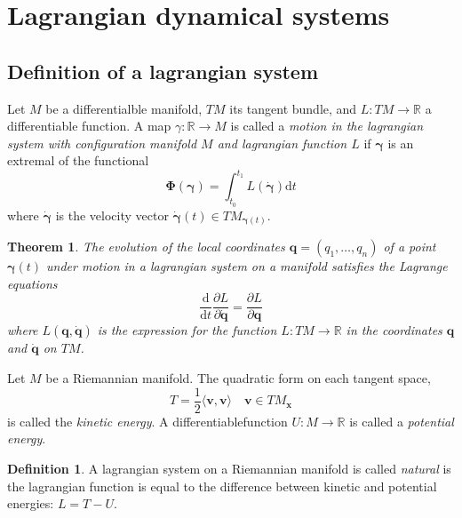 \documentclass[conference]{IEEEtran}
\newtheorem{theorem}{Theorem}[section]
\theoremstyle{definition}
\newtheorem{definition}{Definition}[section]
\theoremstyle{remark}
\begin{document}
    \section{Lagrangian dynamical systems}
    \subsection{Definition of a lagrangian system}
    Let $M$ be a differentialble manifold, $TM$ its tangent bundle, and $L: TM \to \mathbb{R}$ a differentiable function. A map $\gamma: \mathbb{R} \to M$ is called a \emph{motion in the lagrangian system with configuration manifold $M$ and lagrangian function $L$} if $\bm{\gamma}$ is an extremal of the functional
    \begin{equation*}
        \bm{\Phi}(\bm{\gamma}) = \int_{t_0}^{t_1} L(\dot{\bm{\gamma}}) \mathrm{d} t
    \end{equation*}
    where $\dot{\bm{\gamma}}$ is the velocity vector $\dot{\bm{\gamma}}(t) \in TM_{\bm{\gamma}(t)}$.

    \begin{theorem}
        The evolution of the local coordinates $\mathbf{q} = (q_1, \dots, q_n)$ of a point $\bm{\gamma}(t)$ under motion in a lagrangian system on a manifold satisfies the Lagrange equations
        \begin{equation*}
            \dfrac{\mathrm{d}}{\mathrm{d} t} \dfrac{\partial L}{\partial \dot{\mathbf{q}}} = \dfrac{\partial L}{\partial \mathbf{q}}
        \end{equation*}
        where $L(\mathbf{q}, \dot{\mathbf{q}})$ is the expression for the function $L: TM \to \mathbb{R}$ in the coordinates $\mathbf{q}$ and $\dot{\mathbf{q}}$ on $TM$.
    \end{theorem}

    Let $M$ be a Riemannian manifold. The quadratic form on each tangent space,
    \begin{equation*}
        T = \dfrac12 \langle \mathbf{v}, \mathbf{v} \rangle \quad \mathbf{v} \in TM_{\mathbf{x}}
    \end{equation*}
    is called the \emph{kinetic energy}. A differentiablefunction $U: M \to \mathbb{R}$ is called a \emph{potential energy}.

    \begin{definition}
        A lagrangian system on a Riemannian manifold is called \emph{natural} is the lagrangian function is equal to the difference between kinetic and potential energies: $L = T - U$.
    \end{definition}
\end{document}
